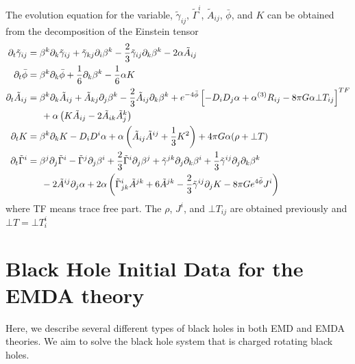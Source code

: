 \documentclass[prd]{revtex4}
\begin{document}
The evolution equation for the variable, $\tilde{\gamma}_{ij}$, $\tilde{\Gamma}^i$, $\tilde{A}_{ij}$, $\bar{\phi}$, and $K$ can be obtained from the decomposition of the Einstein tensor
\begin{align}
\partial_t \tilde{\gamma}_{ij} &= \beta^k \partial_k \tilde{\gamma}_{ij} + \tilde{\gamma}_{kj} \partial_i \beta^k -\frac{2}{3} \tilde{\gamma}_{ij} \partial_k \beta^k - 2 \alpha \tilde{A}_{ij} \\
\partial_t \bar{\phi} &= \beta^k \partial_k \bar{\phi} + \frac{1}{6} \partial_k \beta^k - \frac{1}{6} \alpha K \\
\partial_t \tilde{A}_{ij} &= \beta^k \partial_k \tilde{A}_{ij} + \tilde{A}_{kj} \partial_j \beta^k -\frac{2}{3} \tilde{A}_{ij} \partial_k \beta^k + e^{-4 \bar{\phi}} \left[ - D_i D_j \alpha + \alpha ^{(3)}R_{ij} - 8 \pi G \alpha \bot T_{ij}\right]^{TF} \nonumber \\
				&\indent + \alpha \left( K \tilde{A}_{ij} - 2 \tilde{A}_{ik} \tilde{A}_{j}^k \right) \\
\partial_t K &= \beta^k \partial_k K - D_i D^i \alpha + \alpha \left(\tilde{A}_{ij} \tilde{A}^{ij} + \frac{1}{3} K^2 \right) + 4 \pi G \alpha ( \rho + \bot T) \\
\partial_t \tilde{\Gamma}^i &= \beta^j \partial_j \tilde{\Gamma}^i - \tilde{\Gamma}^j \partial_j \beta^i+ \frac{2}{3} \tilde{\Gamma}^i \partial_j \beta^j + \tilde{\gamma}^{jk} \partial_j \partial_k \beta^i + \frac{1}{3} \tilde{\gamma}^{ij} \partial_j \partial_k \beta^k \nonumber \\
					&\indent - 2 \tilde{A}^{ij} \partial_j \alpha + 2 \alpha \left(\tilde{\Gamma}_{jk}^i \tilde{A}^{jk} + 6 \tilde{A}^{jk} -\frac{2}{3} \tilde{\gamma}^{ij} \partial_j K - 8 \pi G e^{4 \bar{\phi}} J^i \right)
\end{align}
where TF means trace free part. The $\rho$, $J^i$, and $\bot T_{ij}$ are obtained previously and $\bot T = \bot T_i^i$

\section{Black Hole Initial Data for the EMDA theory}
Here, we describe several different types of black holes in both EMD and EMDA theories. We aim to solve the black hole system that is charged rotating black holes. 

\end{document}

